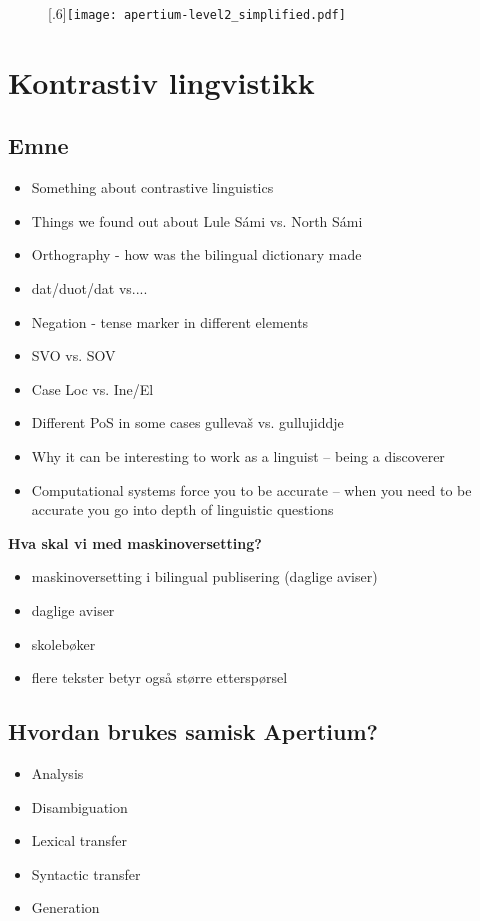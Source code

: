 \documentclass[a4paper,english,12pt]{article}
\begin{document}
\begin{spacing}{1.0}
 
\begin{figure}
\scalebox{.6}[.6]{\texttt{[image: apertium-level2\_simplified.pdf]}}
 \end{figure}


\section{Kontrastiv lingvistikk} 
\subsection{Emne}
\begin{itemize}
\item Something about contrastive linguistics  
\item Things we found out about Lule Sámi vs. North Sámi  
\item Orthography - how was the bilingual dictionary made  
\item dat/duot/dat vs.... 
\item Negation - tense marker in different elements  
\item SVO vs. SOV  
\item Case Loc vs. Ine/El  
\item Different PoS in some cases gullevaš vs. gullujiddje  
\item Why it can be interesting to work as a linguist -- being a discoverer  
\item Computational systems force you to be accurate -- when you need to be accurate you go into depth of linguistic questions
\end{itemize} 

\textbf{Hva skal vi med maskinoversetting?}
\begin{itemize}
\item maskinoversetting i bilingual publisering (daglige aviser)
\item daglige aviser
\item skolebøker
\item flere tekster betyr også større etterspørsel
\end{itemize}

\subsection{Hvordan brukes samisk Apertium?}

\begin{itemize}
\item Analysis
\item Disambiguation
\item Lexical transfer
\item Syntactic transfer
\item Generation
\end{itemize}


\end{spacing}
\end{document}
